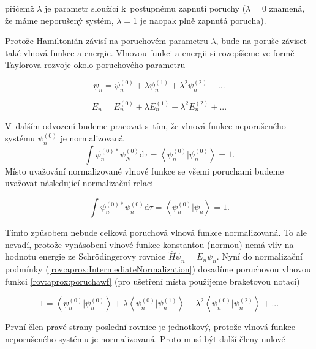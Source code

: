 \noindent přičemž $ \lambda $ je parametr sloužící k~postupnému zapnutí poruchy ($ \lambda = 0 $ znamená, že máme neporušený systém, $ \lambda=1 $ je naopak plně zapnutá porucha).

Protože Hamiltonián závisí na poruchovém parametru $\lambda$, bude na poruše záviset také vlnová funkce a energie. Vlnovou funkci a energii si rozepíšeme ve formě Taylorova rozvoje okolo poruchového parametru

\begin{equation}
\psi_{n}=\psi^{(0)}_{n}+\lambda \psi^{(1)}_{n}+\lambda^2 \psi^{(2)}_{n}+...
\label{rov:aprox:poruchawf}
\end{equation}

\begin{equation}
E_{n}=E^{(0)}_{n}+\lambda E^{(1)}_{n}+\lambda^2 E^{(2)}_{n}+...
\end{equation}

V~dalším odvození budeme pracovat s~tím, že vlnová funkce neporušeného systému $\psi^{(0)}_n$ je normalizovaná
\begin{equation}
\int \psi_n^{(0)\ast} \psi_N^{(0)} \mathrm{d} \tau  = \left <\psi^{(0)}_n |\psi^{(0)}_n\right >=1.
\end{equation}
Místo uvažování normalizované vlnové funkce se všemi poruchami budeme uvažovat následující normalizační relaci

\begin{equation}
\int \psi_n^{(0) \ast} \psi_n^{(0)} \mathrm{d} \tau =\left <\psi^{(0)}_n |\psi_n\right >=1.
\label{rov:aprox:IntermediateNormalization}
\end{equation}

\noindent Tímto způsobem nebude celková poruchová vlnová funkce normalizovaná. To ale nevadí, protože vynásobení vlnové funkce konstantou (normou) nemá vliv na hodnotu energie ze Schrödingerovy rovnice $ \hat{H}\psi_n=E_n\psi_n $. Nyní do normalizační podmínky (\ref{rov:aprox:IntermediateNormalization}) dosadíme poruchovou vlnovou funkci \ref{rov:aprox:poruchawf} (pro ušetření místa použijeme braketovou notaci)

\begin{equation}
1=\left <\psi^{(0)}_n |\psi^{(0)}_n \right >+
\lambda \left <\psi^{(0)}_n |\psi^{(1)}_n \right >+
\lambda^2 \left <\psi^{(0)}_n |\psi^{(2)}_n \right > + ...
\end{equation}

První člen pravé strany poslední rovnice je jednotkový, protože vlnová funkce neporušeného systému je normalizovaná. Proto musí být další členy nulové


